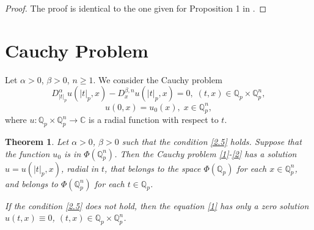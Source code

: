 \documentclass[14pt]{article}
\theoremstyle{theorem}
\newtheorem{theorem}{Theorem}[section]
\theoremstyle{theorem}
\theoremstyle{definition}
\theoremstyle{lemma}
\newcommand{\Label}[1]{\label{#1}}
\numberwithin{equation}{section}
\begin{document}
\begin{proof}
The proof is identical to the one given for Proposition 1 in \cite{K2008}.
\end{proof}

\section{Cauchy Problem}

Let $\alpha>0$, $\beta>0$, $n\geq1$. We consider the Cauchy problem
\begin{equation}\Label{1}
D_{|t|_p}^{\alpha}u(|t|_p,x)-D_x^{\beta,n}u(|t|_p,x)=0,\;(t,x)\in\mathbb{Q}_p\times\mathbb{Q}_p^n,
\end{equation}
\begin{equation}\Label{2}
u(0,x)=u_0(x),\;x\in\mathbb{Q}_p^n,
\end{equation}
where $u:\mathbb{Q}_p\times\mathbb{Q}_p^n\to\mathbb{C}$ is a radial function with respect to $t$.

\begin{theorem}\Label{th1}
Let $\alpha>0$, $\beta>0$ such that the condition \eqref{2.5} holds. Suppose that the function $u_0$ is in $\Phi(\mathbb{Q}_p^n)$. Then the Cauchy problem \eqref{1}-\eqref{2} has a solution $u=u(|t|_p,x)$, radial in $t$, that belongs to the space $\Phi(\mathbb{Q}_p)$ for each $x\in\mathbb{Q}_p^n$, and belongs to $\Phi(\mathbb{Q}_p^n)$ for each $t\in\mathbb{Q}_p$.

If the condition \eqref{2.5} does not hold, then the equation \eqref{1} has only a zero solution $u(t,x)\equiv0$, $(t,x)\in\mathbb{Q}_p\times\mathbb{Q}_p^n$.
\end{theorem}
\end{document}
